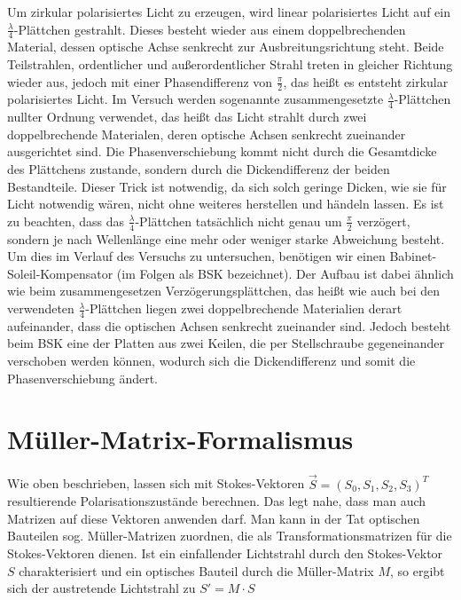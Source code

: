 \documentclass[bigchapter,colorback,accentcolor=tud4b,linedtoc,11pt]{tudreport}
\begin{document}
\vspace{\baselineskip}Um zirkular polarisiertes Licht zu erzeugen, wird linear polarisiertes Licht auf ein $\frac{\lambda}{4}$-Plättchen gestrahlt. Dieses besteht wieder aus einem doppelbrechenden Material, dessen optische Achse senkrecht zur Ausbreitungsrichtung steht. Beide Teilstrahlen, ordentlicher und außerordentlicher Strahl treten in gleicher Richtung wieder aus, jedoch mit einer Phasendifferenz von $\frac{\pi}{2}$, das heißt es entsteht zirkular polarisiertes Licht. Im Versuch werden sogenannte zusammengesetzte $\frac{\lambda}{4}$-Plättchen nullter Ordnung verwendet, das heißt das Licht strahlt durch zwei doppelbrechende Materialen, deren optische Achsen senkrecht zueinander ausgerichtet sind. Die Phasenverschiebung kommt nicht durch die Gesamtdicke des Plättchens zustande, sondern durch die Dickendifferenz der beiden Bestandteile. Dieser Trick ist notwendig, da sich solch geringe Dicken, wie sie für Licht notwendig wären, nicht ohne weiteres herstellen und händeln lassen. Es ist zu beachten, dass das $\frac{\lambda}{4}$-Plättchen tatsächlich nicht genau um $\frac{\pi}{2}$ verzögert, sondern je nach Wellenlänge eine mehr oder weniger starke Abweichung besteht. Um dies im Verlauf des Versuchs zu untersuchen, benötigen wir einen Babinet-Soleil-Kompensator (im Folgen als BSK bezeichnet). Der Aufbau ist dabei ähnlich wie beim zusammengesetzen Verzögerungsplättchen, das heißt wie auch bei den verwendeten $\frac{\lambda}{4}$-Plättchen liegen zwei doppelbrechende Materialien derart aufeinander, dass die optischen Achsen senkrecht zueinander sind. Jedoch besteht beim BSK eine der Platten aus zwei Keilen, die per Stellschraube gegeneinander verschoben werden können, wodurch sich die Dickendifferenz und somit die Phasenverschiebung ändert. 

\section{Müller-Matrix-Formalismus}
Wie oben beschrieben, lassen sich mit Stokes-Vektoren $\vec{S}= (S_0, S_1, S_2, S_3)^T$ resultierende Polarisationszustände berechnen. Das legt nahe, dass man auch Matrizen auf diese Vektoren anwenden darf. Man kann in der Tat optischen Bauteilen sog. Müller-Matrizen zuordnen, die als Transformationsmatrizen für die Stokes-Vektoren dienen. Ist ein einfallender Lichtstrahl durch den Stokes-Vektor $S$ charakterisiert und ein optisches Bauteil durch die Müller-Matrix $M$, so ergibt sich der austretende Lichtstrahl zu $S' = M \cdot S$ 
\end{document}
